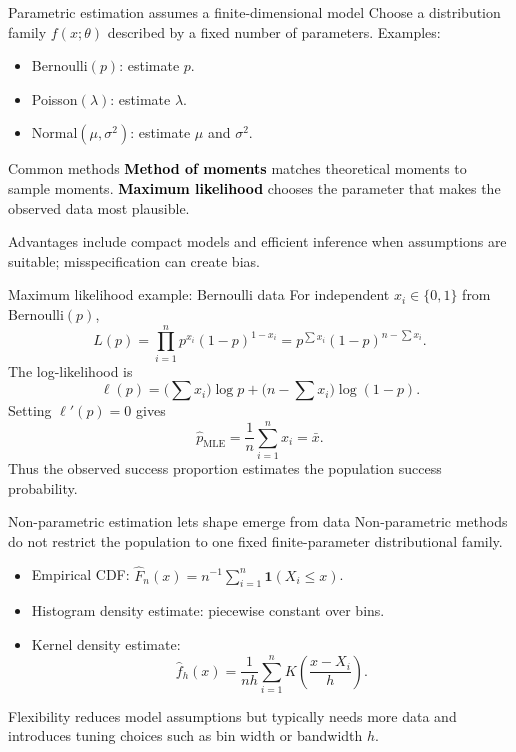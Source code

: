 \documentclass[aspectratio=169,11pt]{beamer}
\newcommand{\key}[1]{\textcolor{black}{\textbf{#1}}}
\begin{document}
\begin{frame}{Parametric estimation assumes a finite-dimensional model}
Choose a distribution family $f(x;\theta)$ described by a fixed number of parameters. Examples:
\begin{itemize}
  \item Bernoulli$(p)$: estimate $p$.
  \item Poisson$(\lambda)$: estimate $\lambda$.
  \item Normal$(\mu,\sigma^2)$: estimate $\mu$ and $\sigma^2$.
\end{itemize}
\begin{block}{Common methods}
\key{Method of moments} matches theoretical moments to sample moments. \key{Maximum likelihood} chooses the parameter that makes the observed data most plausible.
\end{block}
Advantages include compact models and efficient inference when assumptions are suitable; misspecification can create bias.
\end{frame}

\begin{frame}{Maximum likelihood example: Bernoulli data}
For independent $x_i\in\{0,1\}$ from Bernoulli$(p)$,
\[
L(p)=\prod_{i=1}^n p^{x_i}(1-p)^{1-x_i}
=p^{\sum x_i}(1-p)^{n-\sum x_i}.
\]
The log-likelihood is
\[
\ell(p)=\Big(\sum x_i\Big)\log p+\Big(n-\sum x_i\Big)\log(1-p).
\]
Setting $\ell'(p)=0$ gives
\[
\boxed{\hat p_{\mathrm{MLE}}=\frac{1}{n}\sum_{i=1}^n x_i=\bar{x}.}
\]
Thus the observed success proportion estimates the population success probability.
\end{frame}

\begin{frame}{Non-parametric estimation lets shape emerge from data}
Non-parametric methods do not restrict the population to one fixed finite-parameter distributional family.
\begin{itemize}
  \item Empirical CDF: $\hat F_n(x)=n^{-1}\sum_{i=1}^{n}\mathbf{1}(X_i\le x)$.
  \item Histogram density estimate: piecewise constant over bins.
  \item Kernel density estimate:
  \[
  \hat f_h(x)=\frac{1}{nh}\sum_{i=1}^{n}K\!\left(\frac{x-X_i}{h}\right).
  \]
\end{itemize}
Flexibility reduces model assumptions but typically needs more data and introduces tuning choices such as bin width or bandwidth $h$.
\end{frame}
\end{document}
